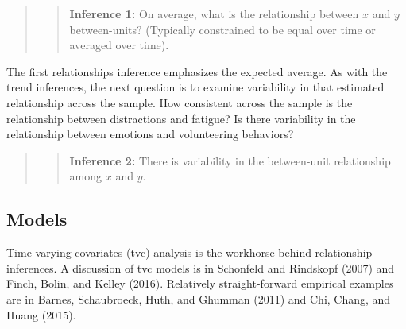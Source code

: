 \documentclass[english,,man]{apa6}
\theoremstyle{definition}
\theoremstyle{definition}
\theoremstyle{definition}
\theoremstyle{remark}
\begin{document}
\begin{quote}
\begin{quote}
\textbf{Inference 1:} On average, what is the relationship between \(x\)
and \(y\) between-units? (Typically constrained to be equal over time or
averaged over time).
\end{quote}
\end{quote}

The first relationships inference emphasizes the expected average. As
with the trend inferences, the next question is to examine variability
in that estimated relationship across the sample. How consistent across
the sample is the relationship between distractions and fatigue? Is
there variability in the relationship between emotions and volunteering
behaviors?

\begin{quote}
\begin{quote}
\textbf{Inference 2:} There is variability in the between-unit
relationship among \(x\) and \(y\).
\end{quote}
\end{quote}

\hypertarget{models-1}{%
\subsection{Models}\label{models-1}}

Time-varying covariates (tvc) analysis is the workhorse behind
relationship inferences. A discussion of tvc models is in Schonfeld and
Rindskopf (2007) and Finch, Bolin, and Kelley (2016). Relatively
straight-forward empirical examples are in Barnes, Schaubroeck, Huth,
and Ghumman (2011) and Chi, Chang, and Huang (2015).
\end{document}
